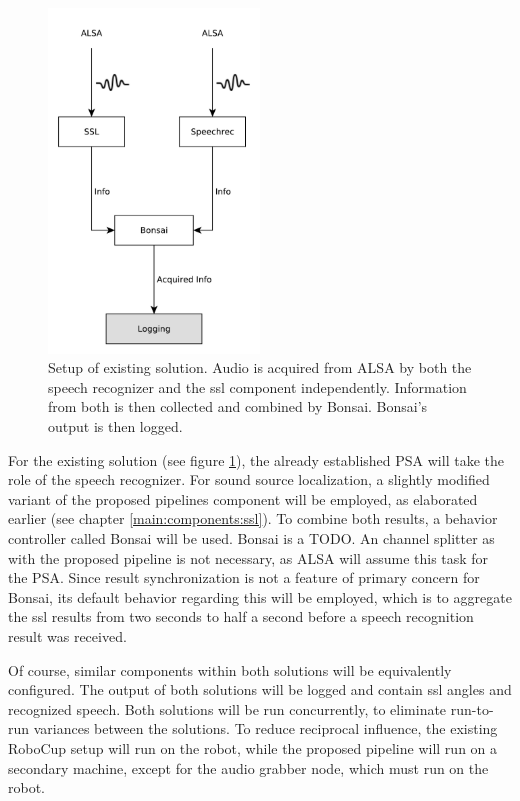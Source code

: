 \begin{figure}[]
	\centering
	\includegraphics[width=0.5\textwidth]{diagrams/eval_task_old.pdf}
	\caption{Setup of existing solution. 
		Audio is acquired from ALSA by both the speech recognizer and the \gls{ssl} component independently. 
		Information from both is then collected and combined by Bonsai.
		Bonsai's output is then logged.}
	\label{pic:eval_task_setup_old}
\end{figure}

For the existing solution (see figure \ref{pic:eval_task_setup_old}), the already established PSA will take the role of the speech recognizer.
For sound source localization, a slightly modified variant of the proposed pipelines component will be employed, as elaborated earlier (see chapter \ref{main:components:ssl}).
To combine both results, a behavior controller called Bonsai \cite{bonsai} will be used.
Bonsai is a TODO.
An channel splitter as with the proposed pipeline is not necessary, as ALSA will assume this task for the PSA.
Since result synchronization is not a feature of primary concern for Bonsai, its default behavior regarding this will be employed, which is to aggregate the \gls{ssl} results from two seconds to half a second before a speech recognition result was received.

Of course, similar components within both solutions will be equivalently configured.
The output of both solutions will be logged and contain \gls{ssl} angles and recognized speech.
Both solutions will be run concurrently, to eliminate run-to-run variances between the solutions.
To reduce reciprocal influence, the existing RoboCup setup will run on the robot, while the proposed pipeline will run on a secondary machine, except for the audio grabber node, which must run on the robot.

